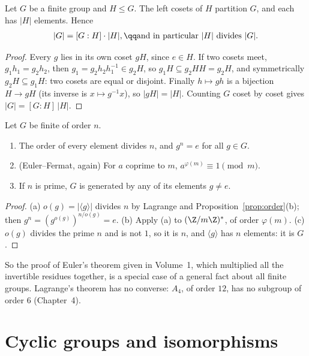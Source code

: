 \begin{theorem}[Lagrange]\label{thm:lagrange}
Let $G$ be a finite group and $H\le G$. The left cosets of $H$ partition $G$, and each has $|H|$ elements. Hence
\[
\begin{gathered}|G|=[G:H]\cdot|H|,\qq\text{and in particular }|H|\text{ divides }|G|.\end{gathered}
\]
\end{theorem}
\begin{proof}
Every $g$ lies in its own coset $gH$, since $e\in H$. If two cosets meet, $g_1h_1=g_2h_2$, then $g_1=g_2h_2h_1^{-1}\in g_2H$, so $g_1H\subseteq g_2HH=g_2H$, and symmetrically $g_2H\subseteq g_1H$: two cosets are equal or disjoint. Finally $h\mapsto gh$ is a bijection $H\to gH$ (its inverse is $x\mapsto g^{-1}x$), so $|gH|=|H|$. Counting $G$ coset by coset gives $|G|=[G:H]\,|H|$.
\end{proof}

\begin{corollary}\label{cor:lagrange}
Let $G$ be finite of order $n$.
\begin{enumerate}[label=(\alph*)]
\item The order of every element divides $n$, and $g^n=e$ for all $g\in G$.
\item (Euler--Fermat, again) For $a$ coprime to $m$, $a^{\varphi(m)}\equiv1\pmod m$.
\item If $n$ is prime, $G$ is generated by any of its elements $g\ne e$.
\end{enumerate}
\end{corollary}
\begin{proof}
(a) $o(g)=|\langle g\rangle|$ divides $n$ by Lagrange and Proposition~\ref{prop:order}(b); then $g^n=(g^{o(g)})^{n/o(g)}=e$. (b) Apply (a) to $(\Z/m\Z)^*$, of order $\varphi(m)$. (c) $o(g)$ divides the prime $n$ and is not $1$, so it is $n$, and $\langle g\rangle$ has $n$ elements: it is $G$.
\end{proof}

So the proof of Euler's theorem given in Volume~1, which multiplied all the invertible residues together, is a special case of a general fact about all finite groups. Lagrange's theorem has no converse: $A_4$, of order $12$, has no subgroup of order $6$ (Chapter~4).

\section{Cyclic groups and isomorphisms}

